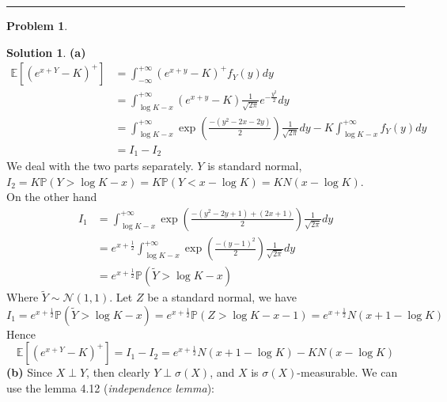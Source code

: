 \documentclass[a4paper, 10pt]{article}
\theoremstyle{definition}
\newtheorem{problem}{Problem}
\theoremstyle{hSol}
\newtheorem*{solution}{Solution}
\begin{document}
\noindent\rule{16cm}{0.4pt}
\begin{problem}
\end{problem}
\begin{solution} \textbf{(a)} 
\begin{equation}
	\begin{split}
		\mathbb{E}\left[(e^{x+Y}-K)^+\right] &= \int_{-\infty}^{+\infty} (e^{x+y}-K)^+ f_Y(y) dy \\
		&= \int_{\log K - x}^{+\infty} (e^{x+y}-K) \frac{1}{\sqrt{2\pi}} e^{-\frac{y^2}{2}} dy \\
		&= \int_{\log K - x}^{+\infty} \exp\left(\frac{-(y^2-2x-2y)}{2}\right)\frac{1}{\sqrt{2\pi}} dy - K\int_{\log K - x}^{+\infty} f_Y(y) dy\\
		&= I_1 - I_2
	\end{split}
\end{equation}
We deal with the two parts separately. $Y$ is standard normal, $I_2 = K \mathbb{P}\left(Y>\log K -x\right) = K \mathbb{P}\left(Y<x-\log K\right) = K N(x-\log K)$. \\
On the other hand
\begin{equation}
	\begin{split}
		I_1 &= \int_{\log K - x}^{+\infty} \exp\left(\frac{-(y^2-2y+1)+(2x+1)}{2}\right)\frac{1}{\sqrt{2\pi}} dy \\
		&= e^{x+\frac{1}{2}} \int_{\log K - x}^{+\infty} \exp\left(\frac{-(y-1)^2}{2}\right)\frac{1}{\sqrt{2\pi}} dy \\
		&= e^{x+\frac{1}{2}} \mathbb{P}\left(\tilde{Y}> \log K-x\right)
	\end{split}
\end{equation}
Where $\tilde{Y}\sim \mathcal{N}(1, 1)$. Let $Z$ be a standard normal, we have
\begin{equation}
	I_1 = e^{x+\frac{1}{2}} \mathbb{P}\left(\tilde{Y} > \log K-x\right) = e^{x+\frac{1}{2}} \mathbb{P}\left(Z > \log K-x-1\right) = e^{x+\frac{1}{2}}N(x+1-\log K)
\end{equation}
Hence
\begin{equation}
	\mathbb{E}\left[(e^{x+Y}-K)^+\right]  = I_1 -I_2 = e^{x+\frac{1}{2}}N(x+1-\log K) - K N(x-\log K)
\end{equation}
\textbf{(b)} Since $X\perp Y$, then clearly $Y \perp \sigma(X)$, and $X$ is $\sigma(X)$-measurable. We can use the lemma 4.12 (\textit{independence lemma}):
\begin{equation}
	\begin{split}

\end{split}
\end{equation}
\end{solution}
\end{document}
